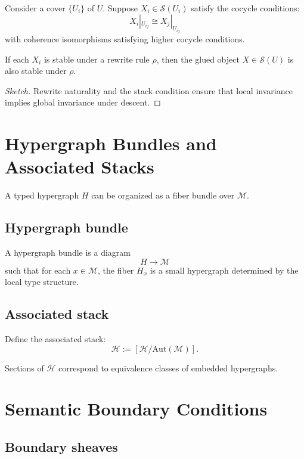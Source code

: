 Consider a cover $\{U_i\}$ of $U$.  
Suppose $X_i\in\mathcal{S}(U_i)$ satisfy the cocycle conditions:
\[
X_i|_{U_{ij}} \cong X_j|_{U_{ij}}
\]
with coherence isomorphisms satisfying higher cocycle conditions.

\begin{proposition}
If each $X_i$ is stable under a rewrite rule $\rho$, then the glued object
$X\in\mathcal{S}(U)$ is also stable under $\rho$.
\end{proposition}

\begin{proof}[Sketch]
Rewrite naturality and the stack condition ensure that local invariance implies
global invariance under descent.
\end{proof}

\section{Hypergraph Bundles and Associated Stacks}

A typed hypergraph $H$ can be organized as a fiber bundle over $\mathcal{M}$.

\subsection{Hypergraph bundle}

\begin{definition}
A hypergraph bundle is a diagram
\[
H \to \mathcal{M}
\]
such that for each $x\in\mathcal{M}$, the fiber $H_x$ is a small hypergraph
determined by the local type structure.
\end{definition}

\subsection{Associated stack}

Define the associated stack:
\[
\mathcal{H} := \left[\mathscr{H} / \mathrm{Aut}(\mathcal{M}) \right].
\]

Sections of $\mathcal{H}$ correspond to equivalence classes of embedded
hypergraphs.

\section{Semantic Boundary Conditions}

\subsection{Boundary sheaves}

